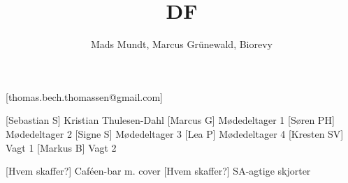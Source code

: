 \documentclass[a4paper,12pt]{article}
\title{DF}
\author{Mads Mundt, Marcus Grünewald, Biorevy}
\begin{document}
\maketitle

\begin{texxers}
	[thomas.bech.thomassen@gmail.com]
\end{texxers}

\begin{roles}
	[Sebastian S] Kristian Thulesen-Dahl
	[Marcus G] Mødedeltager 1
	[Søren PH] Mødedeltager 2
	[Signe S] Mødedeltager 3
	[Lea P] Mødedeltager 4
	[Kresten SV] Vagt 1
	[Markus B] Vagt 2
\end{roles}


\begin{props}
	[Hvem skaffer?] Caféen-bar m. cover
	[Hvem skaffer?] SA-agtige skjorter 
\end{props}
\end{document}
